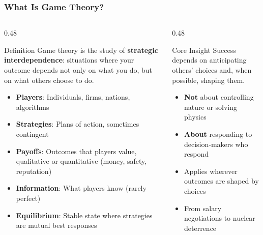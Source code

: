 \begin{frame}[fragile]\frametitle{What Is Game Theory?}
  \begin{columns}
    \begin{column}[T]{0.48\linewidth}
      \begin{block}{Definition}
        Game theory is the study of \textbf{strategic interdependence}: situations where your outcome depends not only on what you do, but on what others choose to do.
      \end{block}
      \vspace{8pt}
      \begin{itemize}
        \item \textbf{Players}: Individuals, firms, nations, algorithms
        \item \textbf{Strategies}: Plans of action, sometimes contingent
        \item \textbf{Payoffs}: Outcomes that players value, qualitative or quantitative (money, safety, reputation)
        \item \textbf{Information}: What players know (rarely perfect)
        \item \textbf{Equilibrium}: Stable state where strategies are mutual best responses
      \end{itemize}
    \end{column}
    \begin{column}[T]{0.48\linewidth}
      \begin{block}{Core Insight}
        Success depends on anticipating others' choices and, when possible, shaping them.
      \end{block}
      \vspace{8pt}
      \begin{itemize}
        \item \textbf{Not} about controlling nature or solving physics
        \item \textbf{About} responding to decision-makers who respond
        \item Applies wherever outcomes are shaped by choices
        \item From salary negotiations to nuclear deterrence
      \end{itemize}
    \end{column}
  \end{columns}
\end{frame}

